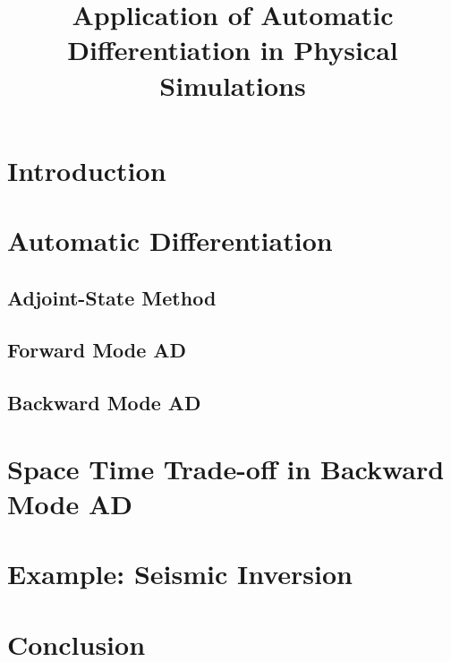 \documentclass{article}
\title{Application of Automatic Differentiation in Physical Simulations}
\author{}
\date{}
\begin{document}
\maketitle

\section{Introduction}



\section{Automatic Differentiation}



\subsection{Adjoint-State Method}



\subsection{Forward Mode AD}

\subsection{Backward Mode AD}



\section{Space Time Trade-off in Backward Mode AD}



\section{Example: Seismic Inversion}





\section{Conclusion}
\end{document}
